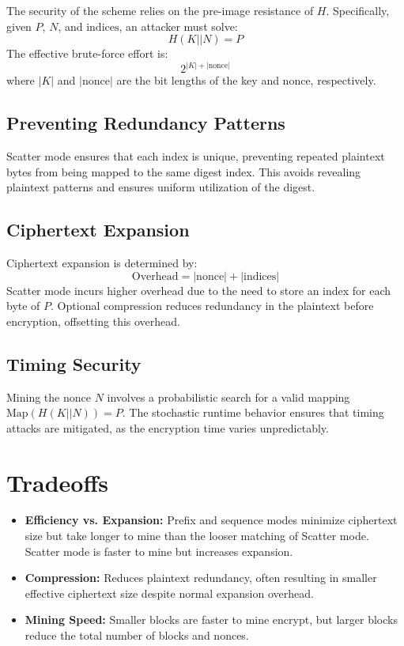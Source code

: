 \documentclass[11pt,a4paper]{article}
\begin{document}
The security of the scheme relies on the pre-image resistance of \( H \). Specifically, given \( P \), \( N \), and \( \text{indices} \), an attacker must solve:
\[
H(K || N) = P
\]
The effective brute-force effort is:
\[
2^{|K| + |\text{nonce}|}
\]
where \( |K| \) and \( |\text{nonce}| \) are the bit lengths of the key and nonce, respectively. 

\subsection*{Preventing Redundancy Patterns}

Scatter mode ensures that each index is unique, preventing repeated plaintext bytes from being mapped to the same digest index. This avoids revealing plaintext patterns and ensures uniform utilization of the digest.

\subsection*{Ciphertext Expansion}

Ciphertext expansion is determined by:
\[
\text{Overhead} = |\text{nonce}| + |\text{indices}|
\]
Scatter mode incurs higher overhead due to the need to store an index for each byte of \( P \). Optional compression reduces redundancy in the plaintext before encryption, offsetting this overhead.

\subsection*{Timing Security}

Mining the nonce \( N \) involves a probabilistic search for a valid mapping \( \text{Map}(H(K || N)) = P \). The stochastic runtime behavior ensures that timing attacks are mitigated, as the encryption time varies unpredictably.

\section*{Tradeoffs}

\begin{itemize}
  \item \textbf{Efficiency vs. Expansion:} Prefix and sequence modes minimize ciphertext size but take longer to mine than the looser matching of Scatter mode. Scatter mode is faster to mine but increases expansion.
  \item \textbf{Compression:} Reduces plaintext redundancy, often resulting in smaller effective ciphertext size despite normal expansion overhead.
  \item \textbf{Mining Speed:} Smaller blocks are faster to mine encrypt, but larger blocks reduce the total number of blocks and nonces.
\end{itemize}
\end{document}
